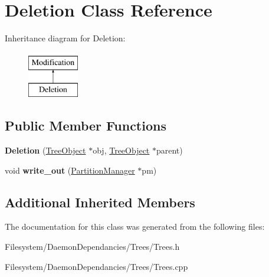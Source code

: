 \hypertarget{classDeletion}{}\section{Deletion Class Reference}
\label{classDeletion}
Inheritance diagram for Deletion\+:\begin{figure}[H]
\begin{center}
\leavevmode
\includegraphics[height=2.000000cm]{classDeletion}
\end{center}
\end{figure}
\subsection*{Public Member Functions}
\begin{DoxyCompactItemize}
\item 
\mbox{\label{classDeletion_a8446318e3f7004ef557b6021350fa389}} 
{\bfseries Deletion} (\mbox{\hyperlink{classTreeObject}{Tree\+Object}} $\ast$obj, \mbox{\hyperlink{classTreeObject}{Tree\+Object}} $\ast$parent)
\item 
\mbox{\label{classDeletion_ac5bdb21c4a8dbc8afea9910435e509a8}} 
void {\bfseries write\+\_\+out} (\mbox{\hyperlink{classPartitionManager}{Partition\+Manager}} $\ast$pm)
\end{DoxyCompactItemize}
\subsection*{Additional Inherited Members}


The documentation for this class was generated from the following files\+:\begin{DoxyCompactItemize}
\item 
Filesystem/\+Daemon\+Dependancies/\+Trees/Trees.\+h\item 
Filesystem/\+Daemon\+Dependancies/\+Trees/Trees.\+cpp\end{DoxyCompactItemize}
